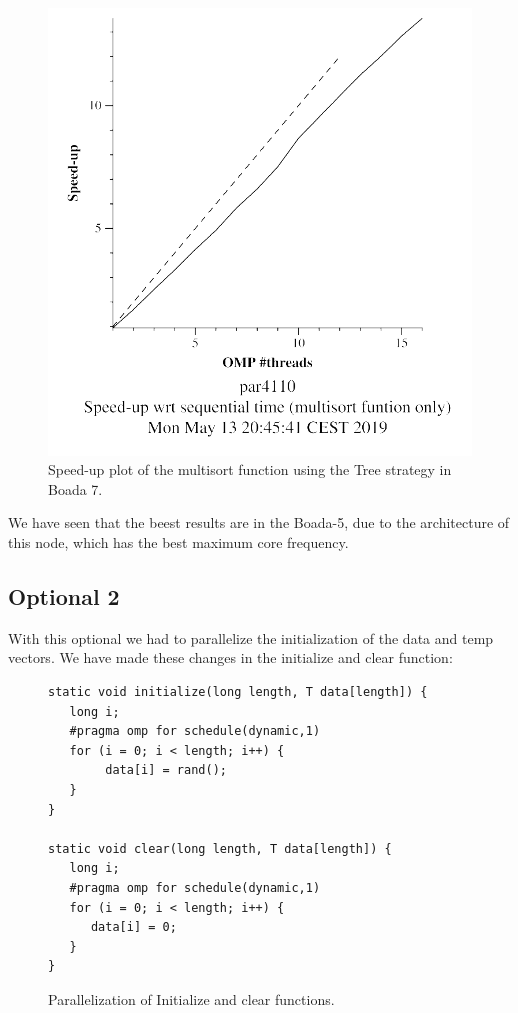 \documentclass[12pt, a4paper]{article}
\begin{document}
\begin{figure}[H]
\begin{minipage}[b]{0.4\linewidth}
  \includegraphics[scale=0.5]{./images/S2/multisort-omp-strong_boada-7_tree_multisort_only}
  \caption{Speed-up plot of the multisort function using the Tree strategy in Boada 7.}
  \label{fig:mandel-omp-10000-strong-21-speedup}
\end{minipage}
\end{figure}

We have seen that the beest results are in the Boada-5, due to the architecture of this node, which has the best maximum core frequency.

\subsection{Optional 2}
With this optional we had to parallelize the initialization of the data and temp vectors. We have made these changes in the initialize and clear function:

\begin{figure}[H]
\begin{lstlisting}
static void initialize(long length, T data[length]) {
   long i;
   #pragma omp for schedule(dynamic,1)
   for (i = 0; i < length; i++) {
		data[i] = rand();
   }
}

static void clear(long length, T data[length]) {
   long i;
   #pragma omp for schedule(dynamic,1)
   for (i = 0; i < length; i++) {
      data[i] = 0;
   }
}
\end{lstlisting}

\caption{Parallelization of Initialize and clear functions.}
\end{figure}
\end{document}
